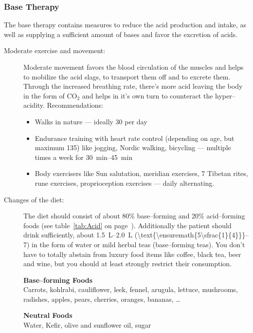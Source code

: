 \documentclass[../main.tex]{subfiles}
\begin{document}
  \subsubsection{Base Therapy}

  The base therapy contains measures to reduce the acid production and intake, as well as supplying a sufficient amount of bases and favor the excretion of acids.

  \begin{description}
  \item[Moderate exercise and movement:] Moderate movement favors the blood circulation of the muscles and
    helps to mobilize the acid slags, to transport them off and to excrete them.
    Through the increased breathing rate, there's more acid leaving the body in the form of CO$_2$ and helps in it's own turn to counteract the hyper--acidity.
    Recommendations:
    \begin{itemize}
    \item Walks in nature --- ideally \SI{30}{\min} per day
    \item Endurance training with heart rate control (depending on age, but maximum 135) like jogging, Nordic walking, bicycling --- multiple times a week for \SIrange{30}{45}{min}
    \item Body exercisers like Sun salutation, meridian exercises, 7 Tibetan rites, rune exercises, proprioception exercises ---  daily alternating.
    \end{itemize}
  \item[Changes of the diet:] The diet should consist of about 80\% base--forming and 20\% acid--forming foods (see table~\ref{tab:Acid} on page~\pageref{tab:Acid}).
    Additionally the patient should drink sufficiently, about \SIrange{1.5}{2.0}{\liter} (\SIrange[parse-numbers=false]{\text{\ensuremath{5\sfrac{1}{4}}}}{7}{\cup})
    in the form of water or mild herbal teas (base--forming teas).
    You don't have to totally abstain from luxury food items like coffee, black tea, beer and wine, but you should at least strongly restrict their consumption.

  
\vspace{2mm}
\noindent
\begin{fminipage}{\textwidth}
  \textbf{Base--forming Foods} \\
Carrots, kohlrabi, cauliflower, leek, fennel, arugula, lettuce, mushrooms, radishes, apples, pears, cherries, oranges, bananas, \ldots
\end{fminipage}
\begin{fminipage}{\textwidth}
  \textbf{Neutral Foods} \\
Water, Kefir, olive and sunflower oil, sugar
\end{fminipage} %



\end{description}
\end{document}
